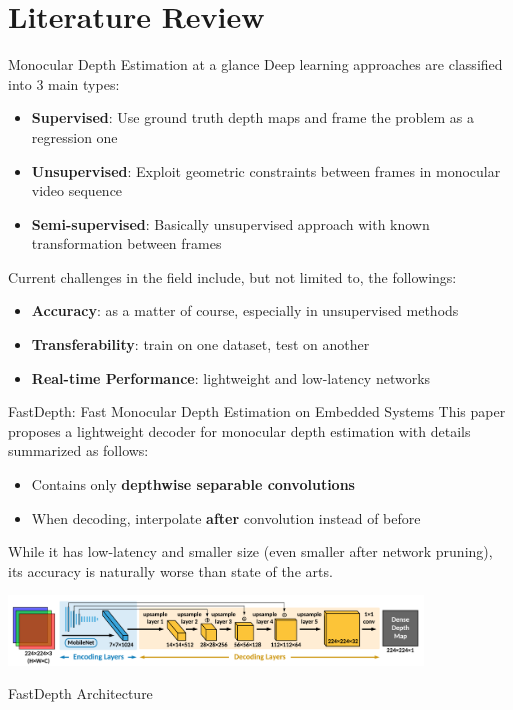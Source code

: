 \documentclass[10pt]{beamer}
\begin{document}
\section{Literature Review}

\begin{frame}{Monocular Depth Estimation at a glance}
    Deep learning approaches are classified into 3 main types:
    \begin{itemize}
        \item \textbf{Supervised}: Use ground truth depth maps and frame the problem as a regression one
        \item \textbf{Unsupervised}: Exploit geometric constraints between frames in monocular video sequence
        \item \textbf{Semi-supervised}: Basically unsupervised approach with known transformation between frames
    \end{itemize}
    
    \vspace{0.3cm}
    
    Current challenges in the field include, but not limited to, the followings:
    \begin{itemize}
        \item \textbf{Accuracy}: as a matter of course, especially in unsupervised methods
        \item \textbf{Transferability}: train on one dataset, test on another
        \item \textbf{Real-time Performance}: lightweight and low-latency networks
    \end{itemize}
\end{frame}

\begin{frame}{FastDepth: Fast Monocular Depth Estimation on Embedded Systems}
    This paper proposes a lightweight decoder for monocular depth estimation with details summarized as follows:
    \begin{itemize}
        \item Contains only \textbf{depthwise separable convolutions}
        \item When decoding, interpolate \textbf{after} convolution instead of before
    \end{itemize}
    While it has low-latency and smaller size (even smaller after network pruning), its accuracy is naturally worse than state of the arts.
    
    \vspace{0.3cm}    
    \centering
    \includegraphics[width=11cm]{fastdepth_architecture.png}\par
    FastDepth Architecture \cite{fastdepth}
\end{frame}
    
\end{document}
